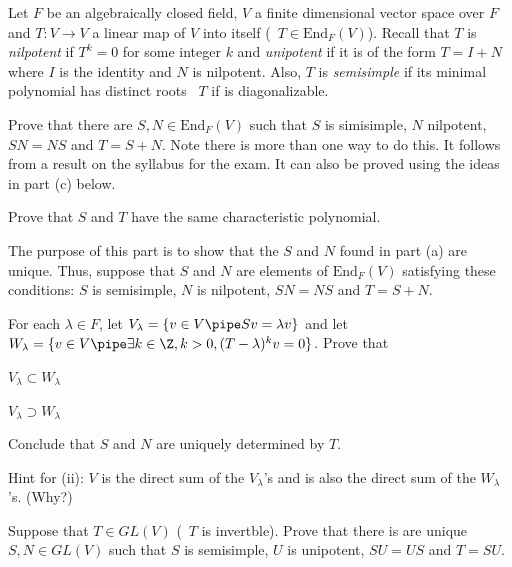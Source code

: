 Let $F$ be an algebraically closed field, $V$ a finite dimensional
vector space over $F$ and $T:V\rightarrow V$ a linear map of $V$ into
itself (\ie\ $T\in \mathrm{End}_F(V)$). Recall that $T$ is
\emph{nilpotent} if $T^k=0$ for some integer $k$ and \emph{unipotent}
if it is of the form $T=I+N$ where $I$ is the identity and $N$ is
nilpotent. Also, $T$ is \emph{semisimple} if its minimal polynomial
has distinct roots \ie\ $T$ if is diagonalizable.
\begin{alist}
\item Prove that there are $S,N\in \mathrm{End}_F(V)$ such that
$S$ is simisimple, $N$ nilpotent, $SN=NS$ and $T=S+N$. Note there is
more than one way to do this. It follows from a result on the syllabus
for the exam. It can also be proved using the ideas in part (c) below.
\item Prove that $S$ and $T$ have the same characteristic polynomial.
\item The purpose of this part is to show that the $S$ and $N$ found
in part (a) are unique. Thus, suppose that $S$ and $N$ are elements of
$\mathrm{End}_F(V)$ satisfying these conditions: $S$ is semisimple,
$N$ is nilpotent, $SN=NS$ and $T=S+N$. 

For each $\lambda\in F$, let $V_{\lambda}=\{v\in V\pipe Sv=\lambda
v\}$ and let $W_{\lambda}=\{v\in V \pipe \exists k\in \Z, k>0,
(T-\lambda)^kv=0\}$. Prove that 
\begin{rlist}
\item $V_{\lambda}\subset W_{\lambda}$ 
\item $V_{\lambda} \supset W_{\lambda}$ 
\end{rlist}
Conclude that $S$ and $N$ are uniquely determined by $T$.

Hint for (ii): $V$ is the direct sum of the $V_{\lambda}$'s and is
also the direct sum of the $W_{\lambda}$'s. (Why?)
\item Suppose that $T\in GL(V)$ (\ie\ $T$ is invertble). Prove that there
is are unique $S,N\in GL(V)$ such that $S$ is semisimple, $U$ is
unipotent, $SU=US$ and $T=SU$.
\end{alist}
